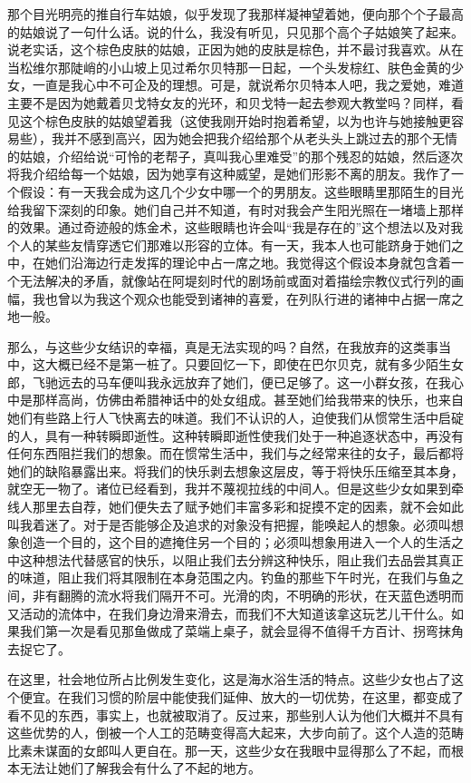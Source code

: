 \par 那个目光明亮的推自行车姑娘，似乎发现了我那样凝神望着她，便向那个个子最高的姑娘说了一句什么话。说的什么，我没有听见，只见那个高个子姑娘笑了起来。说老实话，这个棕色皮肤的姑娘，正因为她的皮肤是棕色，并不最讨我喜欢。从在当松维尔那陡峭的小山坡上见过希尔贝特那一日起，一个头发棕红、肤色金黄的少女，一直是我心中不可企及的理想。可是，就说希尔贝特本人吧，我之爱她，难道主要不是因为她戴着贝戈特女友的光环，和贝戈特一起去参观大教堂吗？同样，看见这个棕色皮肤的姑娘望着我（这使我刚开始时抱着希望，以为也许与她接触更容易些），我并不感到高兴，因为她会把我介绍给那个从老头头上跳过去的那个无情的姑娘，介绍给说“可怜的老帮子，真叫我心里难受”的那个残忍的姑娘，然后逐次将我介绍给每一个姑娘，因为她享有这种威望，是她们形影不离的朋友。我作了一个假设：有一天我会成为这几个少女中哪一个的男朋友。这些眼睛里那陌生的目光给我留下深刻的印象。她们自己并不知道，有时对我会产生阳光照在一堵墙上那样的效果。通过奇迹般的炼金术，这些眼睛也许会叫“我是存在的”这个想法以及对我个人的某些友情穿透它们那难以形容的立体。有一天，我本人也可能跻身于她们之中，在她们沿海边行走发挥的理论中占一席之地。我觉得这个假设本身就包含着一个无法解决的矛盾，就像站在阿堤刻时代的剧场前或面对着描绘宗教仪式行列的画幅，我也曾以为我这个观众也能受到诸神的喜爱，在列队行进的诸神中占据一席之地一般。
\par 那么，与这些少女结识的幸福，真是无法实现的吗？自然，在我放弃的这类事当中，这大概已经不是第一桩了。只要回忆一下，即使在巴尔贝克，就有多少陌生女郎，飞驰远去的马车便叫我永远放弃了她们，便已足够了。这一小群女孩，在我心中是那样高尚，仿佛由希腊神话中的处女组成。甚至她们给我带来的快乐，也来自她们有些路上行人飞快离去的味道。我们不认识的人，迫使我们从惯常生活中启碇的人，具有一种转瞬即逝性。这种转瞬即逝性使我们处于一种追逐状态中，再没有任何东西阻拦我们的想象。而在惯常生活中，我们与之经常来往的女子，最后都将她们的缺陷暴露出来。将我们的快乐剥去想象这层皮，等于将快乐压缩至其本身，就空无一物了。诸位已经看到，我并不蔑视拉线的中间人。但是这些少女如果到牵线人那里去自荐，她们便失去了赋予她们丰富多彩和捉摸不定的因素，就不会如此叫我着迷了。对于是否能够企及追求的对象没有把握，能唤起人的想象。必须叫想象创造一个目的，这个目的遮掩住另一个目的；必须叫想象用进入一个人的生活之中这种想法代替感官的快乐，以阻止我们去分辨这种快乐，阻止我们去品尝其真正的味道，阻止我们将其限制在本身范围之内。钓鱼的那些下午时光，在我们与鱼之间，非有翻腾的流水将我们隔开不可。光滑的肉，不明确的形状，在天蓝色透明而又活动的流体中，在我们身边滑来滑去，而我们不大知道该拿这玩艺儿干什么。如果我们第一次是看见那鱼做成了菜端上桌子，就会显得不值得千方百计、拐弯抹角去捉它了。
\par 在这里，社会地位所占比例发生变化，这是海水浴生活的特点。这些少女也占了这个便宜。在我们习惯的阶层中能使我们延伸、放大的一切优势，在这里，都变成了看不见的东西，事实上，也就被取消了。反过来，那些别人认为他们大概并不具有这些优势的人，倒被一个人工的范畴变得高大起来，大步向前了。这个人造的范畴比素未谋面的女郎叫人更自在。那一天，这些少女在我眼中显得那么了不起，而根本无法让她们了解我会有什么了不起的地方。
